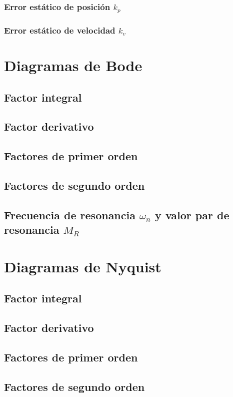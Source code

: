 \subsubsection{Error estático de posición $k_p$}
\subsubsection{Error estático de velocidad $k_v$}

\newpage
\section{Diagramas de Bode}
\subsection{Factor integral}
\subsection{Factor derivativo}
\subsection{Factores de primer orden}
\subsection{Factores de segundo orden}
\subsection{Frecuencia de resonancia $\omega_n$ y valor par de resonancia $M_R$}

\newpage
\section{Diagramas de Nyquist}
\subsection{Factor integral}
\subsection{Factor derivativo}
\subsection{Factores de primer orden}
\subsection{Factores de segundo orden}


